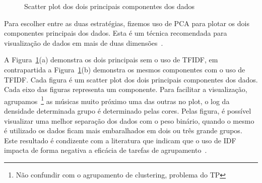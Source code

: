 \documentclass[brazil,a4paper,12pt]{article}
\begin{document}
\begin{figure}[t!]
 \centering
 \mbox{}
 \mbox{}
 \caption{Scatter plot dos dois principais componentes dos dados}
 \label{fig:pca}
\end{figure}

Para escolher entre as duas estratégias, fizemos uso de PCA para plotar os dois
componentes principais dos dados. Esta é um técnica recomendada para visualização
de dados em mais de duas dimensões~\cite{alpaydin2010introduction}. 

A Figura~\ref{fig:pca}(a) demonstra os dois principais sem o uso de TFIDF, em 
contrapartida a Figura~\ref{fig:pca}(b) demonstra os mesmos componentes com o
uso de TFIDF. Cada figura é um scatter plot dos dois principais componentes dos dados. 
Cada eixo das figuras representa um componente. Para facilitar a visualização, 
agrupamos~\footnote{Não confundir com o agrupamento de clustering, problema do TP} 
as músicas muito próximo uma das outras no plot, o log da densidade 
determinada grupo é determinado pelas cores. Pelas figura, é possível visualizar
uma melhor separação dos dados com o peso binário, quando o mesmo é utilizado
os dados ficam mais embaralhados em dois ou três grande grupos. Este resultado
é condizente com a literatura que indicam que o uso de IDF impacta de forma 
negativa a eficácia de tarefas de agrupamento~\cite{ramage2009ctw,haveliwala2002ess}.
\end{document}
